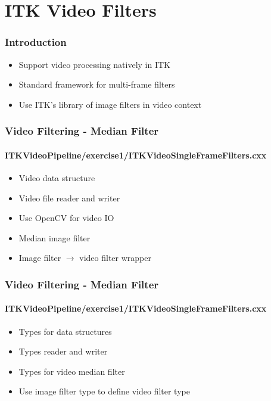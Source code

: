 \section{ITK Video Filters}



\begin{frame}
\frametitle{Introduction}
\begin{itemize}
\item Support video processing natively in ITK
\item Standard framework for multi-frame filters
\item Use ITK's library of image filters in video context
\end{itemize}
\end{frame}


{
\begin{frame}[fragile]
\frametitle{Video Filtering - Median Filter}
\framesubtitle{ITKVideoPipeline/exercise1/ITKVideoSingleFrameFilters.cxx}

\begin{itemize}
\item Video data structure
\pause

\item Video file reader and writer
\item Use OpenCV for video IO
\pause

\item Median image filter
\item Image filter $\rightarrow$ video filter wrapper
\end{itemize}
\end{frame}
}

{
\begin{frame}[fragile]
\frametitle{Video Filtering - Median Filter}
\framesubtitle{ITKVideoPipeline/exercise1/ITKVideoSingleFrameFilters.cxx}
\begin{itemize}
\item Types for data structures
\pause

\item Types reader and writer
\pause

\item Types for video median filter
\item Use image filter type to define video filter type
\end{itemize}
\end{frame}
}

